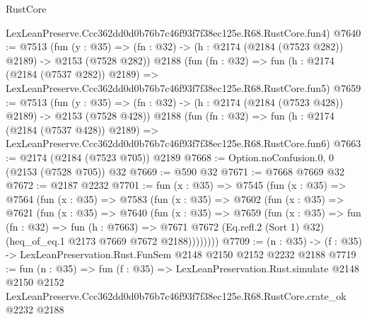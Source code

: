 \begin{lexlean}{RustCore}
\begin{coremodule}
    LexLeanPreserve.Ccc362dd0d0b76b7c46f93f7f38ec125e.R68.RustCore.fun4)
@7640 := @7513
    (fun (y : @35) => (fn : @32) -> (h : @2174 (@2184 (@7523 @282)) @2189) -> @2153 (@7528 @282))
    @2188
    (fun (fn : @32) =>
    fun (h : @2174 (@2184 (@7537 @282)) @2189) =>
    LexLeanPreserve.Ccc362dd0d0b76b7c46f93f7f38ec125e.R68.RustCore.fun5)
@7659 := @7513
    (fun (y : @35) => (fn : @32) -> (h : @2174 (@2184 (@7523 @428)) @2189) -> @2153 (@7528 @428))
    @2188
    (fun (fn : @32) =>
    fun (h : @2174 (@2184 (@7537 @428)) @2189) =>
    LexLeanPreserve.Ccc362dd0d0b76b7c46f93f7f38ec125e.R68.RustCore.fun6)
@7663 := @2174 (@2184 (@7523 @705)) @2189
@7668 := Option.noConfusion.{0, 0} (@2153 (@7528 @705)) @32
@7669 := @590 @32
@7671 := @7668 @7669 @32
@7672 := @2187 @2232
@7701 := fun (x : @35) =>
  @7545
    (fun (x : @35) =>
    @7564
      (fun (x : @35) =>
      @7583
        (fun (x : @35) =>
        @7602
          (fun (x : @35) =>
          @7621
            (fun (x : @35) =>
            @7640
              (fun (x : @35) =>
              @7659
                (fun (x : @35) =>
                fun (fn : @32) =>
                fun (h : @7663) =>
                @7671
                  @7672
                  (Eq.refl.{2} (Sort 1) @32)
                  (heq_of_eq.{1} @2173 @7669 @7672 @2188))))))))
@7709 := (n : @35) -> (f : @35) -> LexLeanPreservation.Rust.FunSem @2148 @2150 @2152 @2232 @2188
@7719 := fun (n : @35) =>
  fun (f : @35) =>
  LexLeanPreservation.Rust.simulate
    @2148
    @2150
    @2152
    LexLeanPreserve.Ccc362dd0d0b76b7c46f93f7f38ec125e.R68.RustCore.crate_ok
    @2232
    @2188
\end{coremodule}
\end{lexlean}
